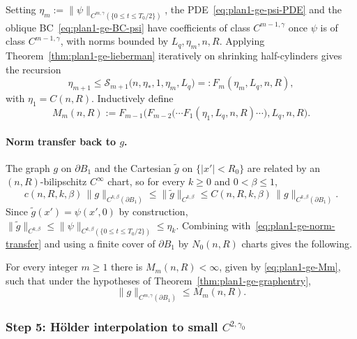 Setting \(\eta_m:=\|\psi\|_{C^{m,\gamma}(\{0\le t\le T_0/2\})}\), the
PDE~\eqref{eq:plan1-ge-psi-PDE} and the oblique
BC~\eqref{eq:plan1-ge-BC-psi} have coefficients of class \(C^{m-1,\gamma}\)
once \(\psi\) is of class \(C^{m-1,\gamma}\), with norms bounded by
\(L_q,\eta_m,n,R\). Applying Theorem~\ref{thm:plan1-ge-lieberman}
iteratively on shrinking half-cylinders gives the recursion
\begin{equation}\label{eq:plan1-ge-recursion}
   \eta_{m+1}\le\mathcal S_{m+1}\bigl(n,\eta_*,1,\eta_m,L_q\bigr)
   =:F_m(\eta_m,L_q,n,R),
\end{equation}
with \(\eta_1=C(n,R)\). Inductively define
\begin{equation}\label{eq:plan1-ge-Mm}
   M_m(n,R):=F_{m-1}\bigl(F_{m-2}\bigl(\cdots F_1(\eta_1,L_q,n,R)\cdots\bigr),L_q,n,R\bigr).
\end{equation}

\paragraph{Norm transfer back to \(g\).}
The graph \(g\) on \(\partial B_1\) and the Cartesian \(\widetilde g\) on
\(\{|x'|<R_0\}\) are related by an \((n,R)\)-bilipschitz \(C^\infty\)
chart, so for every \(k\ge 0\) and \(0<\beta\le 1\),
\begin{equation}\label{eq:plan1-ge-norm-transfer}
   c(n,R,k,\beta)\,\|g\|_{C^{k,\beta}(\partial B_1)}
   \le\|\widetilde g\|_{C^{k,\beta}}
   \le C(n,R,k,\beta)\,\|g\|_{C^{k,\beta}(\partial B_1)}.
\end{equation}
Since \(\widetilde g(x')=\psi(x',0)\) by construction,
\(\|\widetilde g\|_{C^{k,\beta}}\le\|\psi\|_{C^{k,\beta}(\{0\le t\le T_0/2\})}
\le\eta_k\). Combining with~\eqref{eq:plan1-ge-norm-transfer} and using a
finite cover of \(\partial B_1\) by \(N_0(n,R)\) charts gives the
following.

\begin{proposition}
\label{prop:plan1-ge-schauder-bootstrap}
For every integer \(m\ge 1\) there is \(M_m(n,R)<\infty\), given by
\eqref{eq:plan1-ge-Mm}, such that under the hypotheses of
Theorem~\ref{thm:plan1-ge-graphentry},
\begin{equation}\label{eq:plan1-ge-schauder-bound}
   \|g\|_{C^{m,\gamma}(\partial B_1)}\le M_m(n,R).
\end{equation}
\end{proposition}

\subsubsection{Step 5: H\"older interpolation to small \(C^{2,\gamma_0}\)}
\label{subsubsec:plan1-ge-S5}

